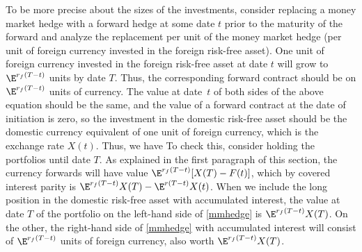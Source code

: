 To be more precise about the sizes of the investments, consider replacing a money market hedge with a forward hedge at some date $t$ prior to the maturity of the forward and analyze the replacement per unit of the money market hedge (per unit of foreign currency invested in the foreign risk-free asset).  One unit of foreign currency invested in the foreign risk-free asset at date $t$ will grow to $\E^{r_f(T-t)}$ units by date $T$.  Thus, the corresponding forward contract should be on $\E^{r_f(T-t)}$ units of currency.  The value at date~$t$ of both sides of the above equation should be the same, and the value of a forward contract at the date of initiation is zero, so the investment in the domestic risk-free asset should be the domestic currency equivalent of one unit of foreign currency, which is the exchange rate $X(t)$.  Thus, we have
To check this, consider holding the portfolios until date $T$.  As explained in the first paragraph of this section, the currency forwards will have value $\E^{r_f(T-t)}[X(T)-F(t)]$, which by covered interest parity is $\E^{r_f(T-t)}X(T)-\E^{r(T-t)}X(t)$.  When we include the long position in the domestic risk-free asset with accumulated interest, the value at date $T$ of the portfolio on the left-hand side of \eqref{mmhedge} is  $\E^{r_f(T-t)}X(T)$.  On the other, the right-hand side of \eqref{mmhedge} with accumulated interest will consist of $\E^{r_f(T-t)}$ units of foreign currency, also worth $\E^{r_f(T-t)}X(T)$.

